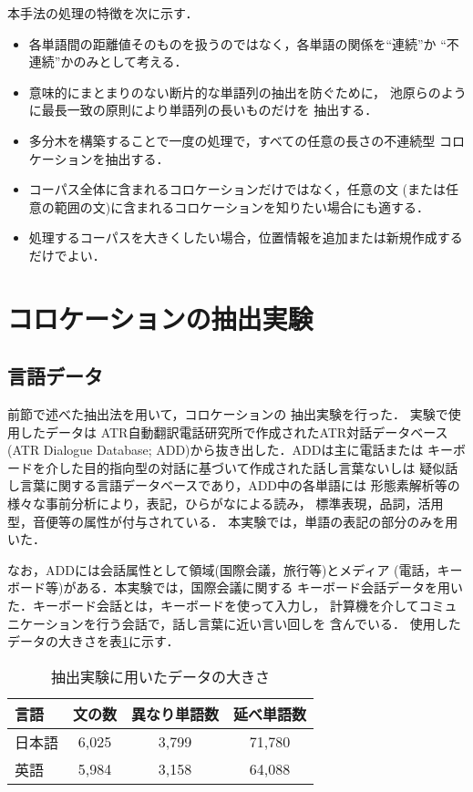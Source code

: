 本手法の処理の特徴を次に示す．
\begin{itemize}
\item[1.] 各単語間の距離値そのものを扱うのではなく，各単語の関係を``連続''か
``不連続''かのみとして考える．
\item[2.] 意味的にまとまりのない断片的な単語列の抽出を防ぐために，
池原ら\cite{Ikehara95}のように最長一致の原則により単語列の長いものだけを
抽出する．
\item[3.] 多分木を構築することで一度の処理で，すべての任意の長さの不連続型
コロケーションを抽出する．
\item[4.] コーパス全体に含まれるコロケーションだけではなく，任意の文
(または任意の範囲の文)に含まれるコロケーションを知りたい場合にも適する．
\item[5.] 処理するコーパスを大きくしたい場合，位置情報を追加または新規作成する
だけでよい．
\end{itemize}

\section{コロケーションの抽出実験}
\label{Sec:experiment}

\subsection{言語データ}

前節で述べた抽出法を用いて，コロケーションの
抽出実験を行った．
実験で使用したデータは
ATR自動翻訳電話研究所で作成されたATR対話データベース
(ATR Dialogue Database; ADD)から抜き出した．ADDは主に電話または
キーボードを介した目的指向型の対話に基づいて作成された話し言葉ないしは
疑似話し言葉に関する言語データベースであり，ADD中の各単語には
形態素解析等の様々な事前分析により，表記，ひらがなによる読み，
標準表現，品詞，活用型，音便等の属性が付与されている．
本実験では，単語の表記の部分のみを用いた．

なお，ADDには会話属性として領域(国際会議，旅行等)とメディア
(電話，キーボード等)がある．本実験では，国際会議に関する
キーボード会話データを用いた．キーボード会話とは，キーボードを使って入力し，
計算機を介してコミュニケーションを行う会話で，話し言葉に近い言い回しを
含んでいる．
使用したデータの大きさを表\ref{Tab:sourcedata}に示す．
\begin{table}[hbt]
\begin{center}
\caption{抽出実験に用いたデータの大きさ}
\label{Tab:sourcedata}
\begin{tabular}{lccc}
\hline
言語 & 文の数 & 異なり単語数 & 延べ単語数\\
\hline
日本語 & 6,025 & 3,799 & 71,780\\
\hline
英語 & 5,984 & 3,158 & 64,088\\
\hline
\end{tabular}
\end{center}
\end{table}

